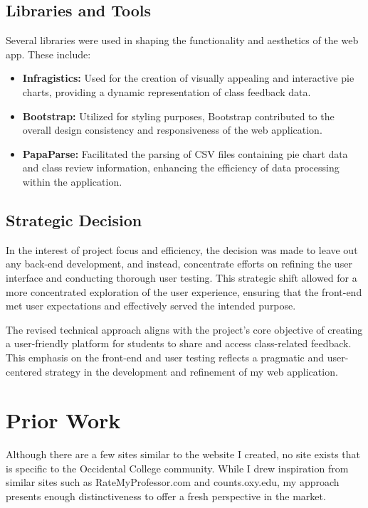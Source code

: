 \documentclass[10pt,twocolumn]{article}
\begin{document}
\subsection{Libraries and Tools}
Several libraries were used in shaping the functionality and aesthetics of the web app. These include:

\begin{itemize}
  \item \textbf{Infragistics:} Used for the creation of visually appealing and interactive pie charts, providing a dynamic representation of class feedback data.
  
  \item \textbf{Bootstrap:} Utilized for styling purposes, Bootstrap contributed to the overall design consistency and responsiveness of the web application.
  
  \item \textbf{PapaParse:} Facilitated the parsing of CSV files containing pie chart data and class review information, enhancing the efficiency of data processing within the application.
\end{itemize}

\subsection{Strategic Decision}
In the interest of project focus and efficiency, the decision was made to leave out any back-end development, and instead, concentrate efforts on refining the user interface and conducting thorough user testing. This strategic shift allowed for a more concentrated exploration of the user experience, ensuring that the front-end met user expectations and effectively served the intended purpose.

The revised technical approach aligns with the project's core objective of creating a user-friendly platform for students to share and access class-related feedback. This emphasis on the front-end and user testing reflects a pragmatic and user-centered strategy in the development and refinement of my web application.


\section{Prior Work}

Although there are a few sites similar to the website I created, no site exists that is specific to the Occidental College community. While I drew inspiration from similar sites such as RateMyProfessor.com and counts.oxy.edu, my approach presents enough distinctiveness to offer a fresh perspective in the market.
\end{document}
